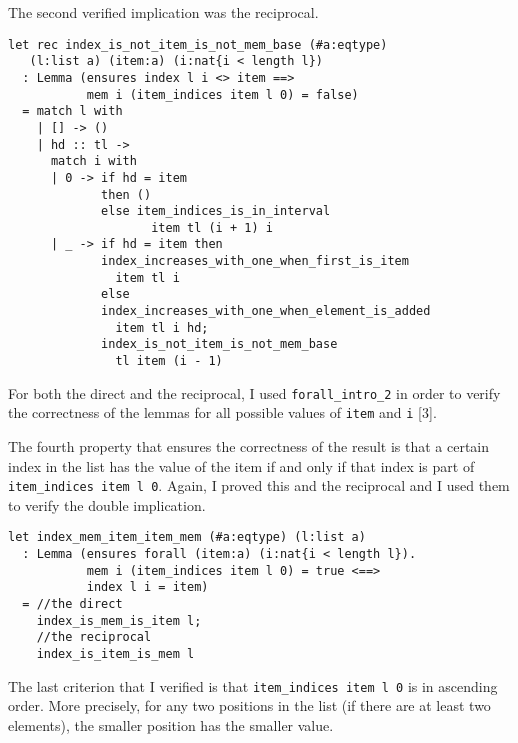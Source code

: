 The second verified implication was the reciprocal. 

\begin{verbatim}
let rec index_is_not_item_is_not_mem_base (#a:eqtype) 
   (l:list a) (item:a) (i:nat{i < length l})
  : Lemma (ensures index l i <> item ==>
           mem i (item_indices item l 0) = false)
  = match l with 
    | [] -> ()
    | hd :: tl -> 
      match i with 
      | 0 -> if hd = item 
             then ()
             else item_indices_is_in_interval
                    item tl (i + 1) i
      | _ -> if hd = item then
             index_increases_with_one_when_first_is_item
               item tl i
             else
             index_increases_with_one_when_element_is_added
               item tl i hd;
             index_is_not_item_is_not_mem_base 
               tl item (i - 1)
\end{verbatim}

For both the direct and the reciprocal, I used \texttt{forall\_intro\_2} in order to verify the correctness of the lemmas for all possible values of \texttt{item} and \texttt{i} [\(3\)].

The fourth property that ensures the correctness of the result is that a certain index in the list has the value of the item if and only if that index is part of \texttt{item\_indices item l 0}. Again, I proved this and the reciprocal and I used them to verify the double implication.

\begin{verbatim}
let index_mem_item_item_mem (#a:eqtype) (l:list a)
  : Lemma (ensures forall (item:a) (i:nat{i < length l}).
           mem i (item_indices item l 0) = true <==>
           index l i = item)
  = //the direct
    index_is_mem_is_item l;
    //the reciprocal
    index_is_item_is_mem l
\end{verbatim}

The last criterion that I verified is that \texttt{item\_indices item l 0} is in ascending order. More precisely, for any two positions in the list (if there are at least two elements), the smaller position has the smaller value. 

